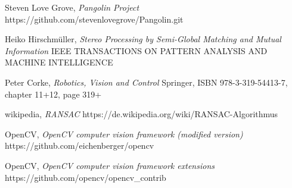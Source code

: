 \documentclass[11pt,a4paper,titlepage,oneside]{report}
\begin{document}
\begin{thebibliography}{1}
	Steven Love Grove,
	\textit{Pangolin Project}
	https://github.com/stevenlovegrove/Pangolin.git

	Heiko Hirschmüller,
	\textit{ Stereo Processing by Semi-Global Matching and Mutual Information}
	IEEE TRANSACTIONS ON PATTERN ANALYSIS AND MACHINE INTELLIGENCE
	 
	Peter Corke,
	\textit{Robotics, Vision and Control}
	Springer, ISBN 978-3-319-54413-7, chapter 11+12, page 319+

	wikipedia,
	\textit{RANSAC}
	https://de.wikipedia.org/wiki/RANSAC-Algorithmus

	OpenCV,
	\textit{OpenCV computer vision framework (modified version)}
	https://github.com/eichenberger/opencv

	OpenCV,
	\textit{OpenCV computer vision framework extensions}
	https://github.com/opencv/opencv\_contrib

\end{thebibliography}
\end{document}
